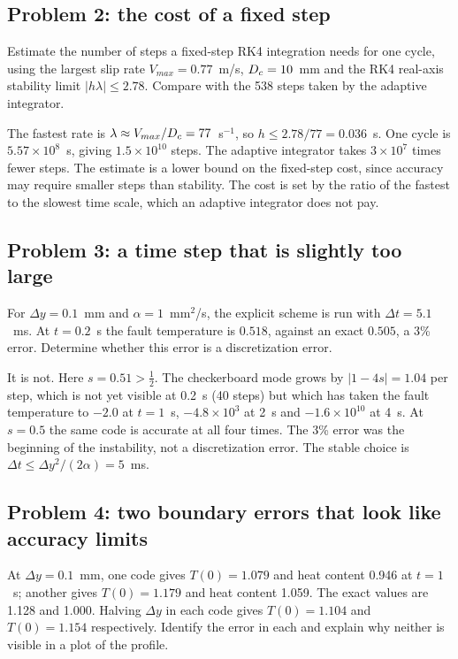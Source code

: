 \subsection*{Problem 2: the cost of a fixed step}

Estimate the number of steps a fixed-step RK4 integration needs for one cycle, using the largest slip rate $V_{max}=0.77$~m/s, $D_c=10$~mm and the RK4 real-axis stability limit $|h\lambda|\le2.78$. Compare with the 538 steps taken by the adaptive integrator.

\solution The fastest rate is $\lambda\approx V_{max}/D_c=77$~s$^{-1}$, so $h\le2.78/77=0.036$~s. One cycle is $5.57\times10^{8}$~s, giving $1.5\times10^{10}$ steps. The adaptive integrator takes $3\times10^{7}$ times fewer steps. The estimate is a lower bound on the fixed-step cost, since accuracy may require smaller steps than stability. The cost is set by the ratio of the fastest to the slowest time scale, which an adaptive integrator does not pay.

\subsection*{Problem 3: a time step that is slightly too large}

For $\Delta y=0.1$~mm and $\alpha=1$~mm$^2$/s, the explicit scheme is run with $\Delta t=5.1$~ms. At $t=0.2$~s the fault temperature is $0.518$, against an exact $0.505$, a 3\% error. Determine whether this error is a discretization error.

\solution It is not. Here $s=0.51>\tfrac12$. The checkerboard mode grows by $|1-4s|=1.04$ per step, which is not yet visible at 0.2~s (40 steps) but which has taken the fault temperature to $-2.0$ at $t=1$~s, $-4.8\times10^3$ at 2~s and $-1.6\times10^{10}$ at 4~s. At $s=0.5$ the same code is accurate at all four times. The 3\% error was the beginning of the instability, not a discretization error. The stable choice is $\Delta t\le\Delta y^2/(2\alpha)=5$~ms.

\subsection*{Problem 4: two boundary errors that look like accuracy limits}

At $\Delta y=0.1$~mm, one code gives $T(0)=1.079$ and heat content 0.946 at $t=1$~s; another gives $T(0)=1.179$ and heat content 1.059. The exact values are 1.128 and 1.000. Halving $\Delta y$ in each code gives $T(0)=1.104$ and $T(0)=1.154$ respectively. Identify the error in each and explain why neither is visible in a plot of the profile.

